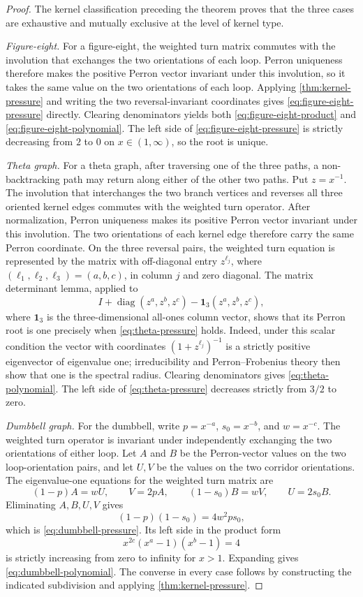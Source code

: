 \documentclass[11pt]{amsart}
\theoremstyle{plain}
\theoremstyle{definition}
\theoremstyle{remark}
\begin{document}
\begin{proof}
The kernel classification preceding the theorem proves that the three cases
are exhaustive and mutually exclusive at the level of kernel type.

\emph{Figure-eight.}  For a figure-eight, the weighted turn
matrix commutes with the involution that exchanges the two orientations of
each loop.  Perron uniqueness therefore makes the positive Perron vector
invariant under this involution, so it takes the same
value on the two orientations of each loop.  Applying
\cref{thm:kernel-pressure} and writing the two reversal-invariant coordinates
gives \eqref{eq:figure-eight-pressure} directly.
Clearing denominators yields both \eqref{eq:figure-eight-product} and
\eqref{eq:figure-eight-polynomial}.  The left side of
\eqref{eq:figure-eight-pressure} is strictly decreasing from \(2\) to \(0\)
on \(x\in(1,\infty)\), so the root is unique.

\emph{Theta graph.}  For a theta graph, after traversing one of the three
paths, a non-backtracking path may return along either of the other two paths.
Put \(z=x^{-1}\).  The involution that interchanges the two branch vertices
and reverses all three oriented kernel edges commutes with the weighted turn
operator.  After normalization, Perron uniqueness makes its positive Perron
vector invariant under this involution.  The two orientations of each kernel
edge therefore carry the same Perron coordinate.  On the three reversal
pairs, the weighted turn equation is represented by the matrix with
off-diagonal entry \(z^{\ell_j}\), where
\((\ell_1,\ell_2,\ell_3)=(a,b,c)\), in column \(j\) and zero
diagonal.  The matrix determinant lemma, applied to
\[
  I+\operatorname{diag}(z^a,z^b,z^c)
  -\mathbf1_3(z^a,z^b,z^c),
\]
where \(\mathbf1_3\) is the three-dimensional all-ones column vector, shows
that its Perron root is one precisely when
\eqref{eq:theta-pressure} holds.  Indeed, under this scalar condition
the vector with coordinates \((1+z^{\ell_j})^{-1}\) is a strictly positive
eigenvector of eigenvalue one; irreducibility and Perron--Frobenius theory
then show that one is the spectral radius.  Clearing denominators gives
\eqref{eq:theta-polynomial}.  The left side of
\eqref{eq:theta-pressure} decreases strictly from \(3/2\) to zero.

\emph{Dumbbell graph.}  For the dumbbell, write
\(p=x^{-a}\), \(s_0=x^{-b}\), and \(w=x^{-c}\).
The weighted turn operator is invariant under independently exchanging
the two orientations of either loop.  Let \(A\) and \(B\) be the
Perron-vector values on the two loop-orientation pairs, and let \(U,V\) be the
values on the two corridor orientations.  The eigenvalue-one equations for
the weighted turn matrix are
\[
  (1-p)A=wU,\qquad V=2pA,\qquad
  (1-s_0)B=wV,\qquad U=2s_0B.
\]
Eliminating \(A,B,U,V\) gives
\[
  (1-p)(1-s_0)=4w^2ps_0,
\]
which is \eqref{eq:dumbbell-pressure}.  Its left side in the product form
\[
  x^{2c}(x^a-1)(x^b-1)=4
\]
is strictly increasing from zero to infinity for \(x>1\).  Expanding gives
\eqref{eq:dumbbell-polynomial}.  The converse in every case follows by
constructing the indicated subdivision and applying
\cref{thm:kernel-pressure}.
\end{proof}
\end{document}
